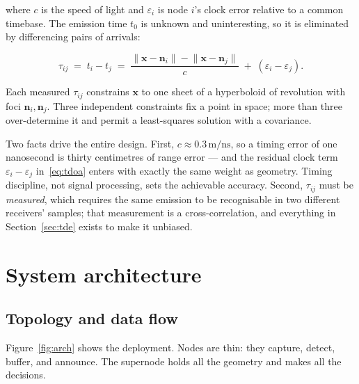 \documentclass[11pt,a4paper]{article}
\begin{document}
where $c$ is the speed of light and $\varepsilon_i$ is node $i$'s clock
error relative to a common timebase. The emission time $t_0$ is unknown and
uninteresting, so it is eliminated by differencing pairs of arrivals:

\begin{equation}
  \tau_{ij} \;=\; t_i - t_j
  \;=\; \frac{\lVert \mathbf{x}-\mathbf{n}_i\rVert
             -\lVert \mathbf{x}-\mathbf{n}_j\rVert}{c}
        \;+\; (\varepsilon_i-\varepsilon_j).
  \label{eq:tdoa}
\end{equation}

Each measured $\tau_{ij}$ constrains $\mathbf{x}$ to one sheet of a
hyperboloid of revolution with foci $\mathbf{n}_i,\mathbf{n}_j$. Three
independent constraints fix a point in space; more than three
over-determine it and permit a least-squares solution with a covariance.

Two facts drive the entire design. First, $c\approx
0.3\,\text{m}/\text{ns}$, so a timing error of one nanosecond is thirty
centimetres of range error --- and the residual clock term
$\varepsilon_i-\varepsilon_j$ in~\eqref{eq:tdoa} enters with exactly the
same weight as geometry. Timing discipline, not signal processing, sets the
achievable accuracy. Second, $\tau_{ij}$ must be \emph{measured}, which
requires the same emission to be recognisable in two different receivers'
samples; that measurement is a cross-correlation, and everything in
Section~\ref{sec:tde} exists to make it unbiased.

\section{System architecture}

\subsection{Topology and data flow}

Figure~\ref{fig:arch} shows the deployment. Nodes are thin: they capture,
detect, buffer, and announce. The supernode holds all the geometry and makes
all the decisions.
\end{document}
